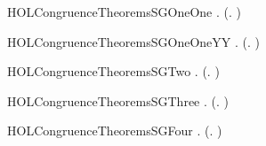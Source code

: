 \newcommand{\HOLCongruenceTheoremsSGOneZero}{\UseVerbatim{HOLCongruenceTheoremsSGOneZero}}
\begin{SaveVerbatim}{HOLCongruenceTheoremsSGOneOne}
\HOLTokenTurnstile{} \HOLSymConst{\HOLTokenForall{}}  .  (\HOLTokenLambda{}. \HOLConst{\ensuremath{\tau}}  \HOLSymConst{\ensuremath{+}}   ) \HOLSymConst{\HOLTokenImp{}}  
\end{SaveVerbatim}
\newcommand{\HOLCongruenceTheoremsSGOneOne}{\UseVerbatim{HOLCongruenceTheoremsSGOneOne}}
\begin{SaveVerbatim}{HOLCongruenceTheoremsSGOneOneYY}
\HOLTokenTurnstile{} \HOLSymConst{\HOLTokenForall{}}  .  (\HOLTokenLambda{}.    \HOLSymConst{\ensuremath{+}} \HOLConst{\ensuremath{\tau}} ) \HOLSymConst{\HOLTokenImp{}}  
\end{SaveVerbatim}
\newcommand{\HOLCongruenceTheoremsSGOneOneYY}{\UseVerbatim{HOLCongruenceTheoremsSGOneOneYY}}
\begin{SaveVerbatim}{HOLCongruenceTheoremsSGTwo}
\HOLTokenTurnstile{} \HOLSymConst{\HOLTokenForall{}} .   \HOLSymConst{\HOLTokenImp{}}  (\HOLTokenLambda{}.   )
\end{SaveVerbatim}
\newcommand{\HOLCongruenceTheoremsSGTwo}{\UseVerbatim{HOLCongruenceTheoremsSGTwo}}
\begin{SaveVerbatim}{HOLCongruenceTheoremsSGThree}
\HOLTokenTurnstile{} \HOLSymConst{\HOLTokenForall{}} .   \HOLSymConst{\HOLTokenImp{}}  (\HOLTokenLambda{}.  )
\end{SaveVerbatim}
\newcommand{\HOLCongruenceTheoremsSGThree}{\UseVerbatim{HOLCongruenceTheoremsSGThree}}
\begin{SaveVerbatim}{HOLCongruenceTheoremsSGFour}
\HOLTokenTurnstile{} \HOLSymConst{\HOLTokenForall{}} .   \HOLSymConst{\HOLTokenConj{}}   \HOLSymConst{\HOLTokenImp{}}  (\HOLTokenLambda{}.   \HOLSymConst{\ensuremath{+}}  )
\end{SaveVerbatim}

